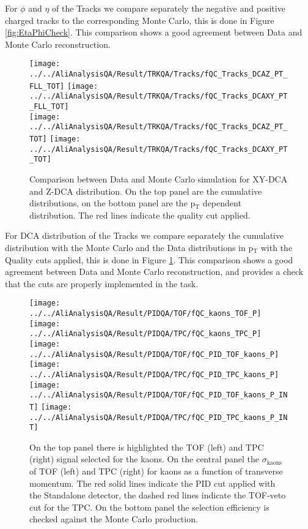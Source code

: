 For $\phi$ and $\eta$ of the Tracks we compare separately the negative and positive charged tracks to the corresponding Monte Carlo, this is done in Figure \ref{fig:EtaPhiCheck}. This comparison shows a good agreement between Data and Monte Carlo reconstruction.

\begin{figure}
\texttt{[image: ../../AliAnalysisQA/Result/TRKQA/Tracks/fQC\_Tracks\_DCAZ\_PT\_FLL\_TOT]}
\texttt{[image: ../../AliAnalysisQA/Result/TRKQA/Tracks/fQC\_Tracks\_DCAXY\_PT\_FLL\_TOT]}\\
\texttt{[image: ../../AliAnalysisQA/Result/TRKQA/Tracks/fQC\_Tracks\_DCAZ\_PT\_TOT]}
\texttt{[image: ../../AliAnalysisQA/Result/TRKQA/Tracks/fQC\_Tracks\_DCAXY\_PT\_TOT]}
\caption{Comparison between Data and Monte Carlo simulation for XY-DCA and Z-DCA distribution. On the top panel are the cumulative distributions, on the bottom panel are the p$_{\text{T}}$ dependent distribution. The red lines indicate the quality cut applied. }
\label{fig:DCACheck}
\end{figure}

For DCA distribution of the Tracks we compare separately the cumulative distribution with the Monte Carlo and the Data distributions in p$_{\text{T}}$ with the Quality cuts applied, this is done in Figure \ref{fig:DCACheck}. This comparison shows a good agreement between Data and Monte Carlo reconstruction, and provides a check that the cuts are properly implemented in the task.

\begin{figure}
\texttt{[image: ../../AliAnalysisQA/Result/PIDQA/TOF/fQC\_kaons\_TOF\_P]}
\texttt{[image: ../../AliAnalysisQA/Result/PIDQA/TPC/fQC\_kaons\_TPC\_P]}\\
\texttt{[image: ../../AliAnalysisQA/Result/PIDQA/TOF/fQC\_PID\_TOF\_kaons\_P]}
\texttt{[image: ../../AliAnalysisQA/Result/PIDQA/TPC/fQC\_PID\_TPC\_kaons\_P]}\\
\texttt{[image: ../../AliAnalysisQA/Result/PIDQA/TOF/fQC\_PID\_TOF\_kaons\_P\_INT]}
\texttt{[image: ../../AliAnalysisQA/Result/PIDQA/TPC/fQC\_PID\_TPC\_kaons\_P\_INT]}\\
\caption{On the top panel there is highlighted the TOF (left) and TPC (right) signal selected for the kaons. On the central panel the $\sigma_{\text{kaons}}$ of TOF (left) and TPC (right) for kaons as a function of transverse momentum. The red solid lines indicate the PID cut applied with the Standalone detector, the dashed red lines indicate the TOF-veto cut for the TPC. On the bottom panel the selection efficiency is checked against the Monte Carlo production.}
\label{fig:PIDCheck}
\end{figure}

